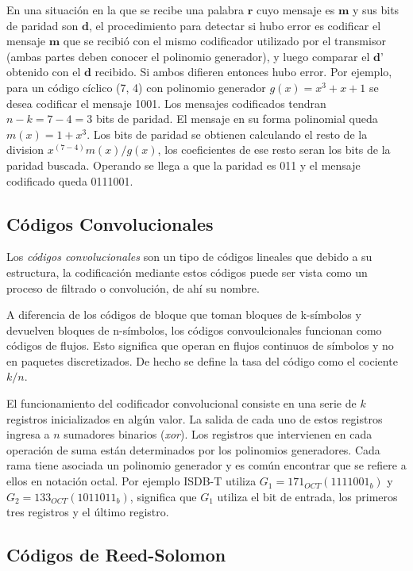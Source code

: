 En una situación en la que se recibe una palabra $\textbf{r}$ cuyo mensaje es $\textbf{m}$  y sus bits de paridad son $\textbf{d}$, el procedimiento para detectar si hubo error es codificar el mensaje $\textbf{m}$ que se recibió con el mismo codificador utilizado por el transmisor (ambas partes deben conocer el polinomio generador), y luego comparar el $\textbf{d'}$ obtenido con el $\textbf{d}$ recibido. Si ambos difieren entonces hubo error. 
Por ejemplo, para un código cíclico (7, 4) con polinomio generador $g(x) = x^3 + x + 1$ se desea codificar el mensaje 1001. Los mensajes codificados tendran $n-k = 7 - 4 = 3$ bits de paridad. El mensaje en su forma polinomial queda $m(x) = 1 + x^3$.
Los bits de paridad se obtienen calculando el resto de la division $x^{(7-4)}m(x)/g(x)$, los coeficientes de ese resto seran los bits de la paridad buscada. Operando se llega a que la paridad es 011 y el mensaje codificado queda 0111001.

\subsection{Códigos Convolucionales}

Los \textit{códigos convolucionales} son un tipo de códigos lineales que debido a su estructura, la codificación mediante estos códigos puede ser vista como un proceso de filtrado o convolución, de ahí su nombre. 

A diferencia de los códigos de bloque que toman bloques de k-símbolos y devuelven bloques de n-símbolos, los códigos convoulcionales funcionan como códigos de flujos. Esto significa que operan en flujos continuos de símbolos y no en paquetes discretizados. De hecho se define la tasa del código como el cociente $k/n$.

El funcionamiento del codificador convolucional consiste en una serie de $k$ registros inicializados en algún valor. La salida de cada uno de estos registros ingresa a $n$ sumadores binarios (\textit{xor}). Los registros que intervienen en cada operación de suma están determinados por los polinomios generadores. Cada rama tiene asociada un polinomio generador y es común encontrar que se refiere a ellos en notación octal. Por ejemplo ISDB-T utiliza $G_1 = 171_{OCT} (1111001_b)$ y $G_2 = 133_{OCT} (1011011_b)$, significa que $G_1$ utiliza el bit de entrada, los primeros tres registros y el último registro. 

\subsection{Códigos de Reed-Solomon}

